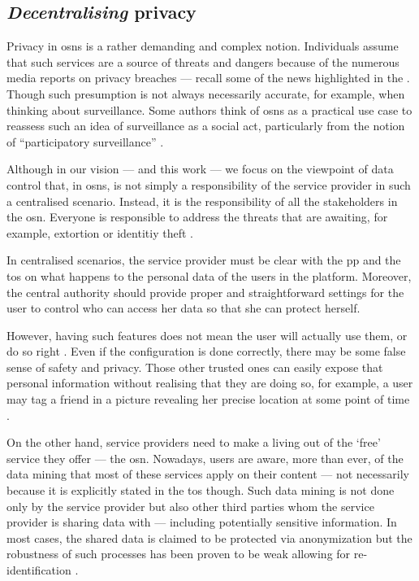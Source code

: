 \subsection{\emph{Decentralising} privacy}
    \label{subsection:thesis:decentralising-privacy}
Privacy in \acp{osn} is a rather demanding and complex notion. Individuals assume 
that such services are a source of threats and dangers because of the numerous media 
reports on privacy breaches --- recall some of the news highlighted in the  
. Though such presumption is not always necessarily 
accurate, for example, when thinking about surveillance. Some authors think of \acp{osn} 
as a practical use case to reassess such an idea of surveillance as a social act, 
particularly from the notion of ``participatory surveillance'' \cite{Albrechtslund08}.

Although in our vision --- and this work --- we focus on the viewpoint of data control 
that, in \acp{osn}, is not simply a responsibility of the service provider in such 
a centralised scenario. Instead, it is the responsibility of all the stakeholders 
in the \ac{osn}. Everyone is responsible to address the threats that are awaiting, 
for example, extortion or identitiy theft \cite{GrossAH05}. 

In centralised scenarios, the service provider must be clear with the \ac{pp} and 
the \ac{tos} on what happens to the personal data of the users in the platform. 
Moreover, the central authority should provide proper and straightforward settings 
for the user to control who can access her data so that she can protect herself. 

However, having such features does not mean the user will actually use them, or   
do so right \cite{KrishnamurthyW08, BrandtzaegLS10}. Even if the configuration is 
done correctly, there may be some false sense of safety and privacy. Those other 
trusted ones can easily expose that personal information without realising that 
they are doing so, for example, a user may tag a friend in a picture revealing her 
precise location at some point of time \cite{ZhelevaG09, SmithSHV12}. 

On the other hand, service providers need to make a living out of the `free' service
they offer --- the \ac{osn}. Nowadays, users are aware, more than ever, of the data 
mining that most of these services apply on their content --- not necessarily because 
it is explicitly stated in the \ac{tos} though. Such data mining is not done only 
by the service provider but also other third parties whom the service provider is 
sharing data with --- including potentially sensitive information. In most cases, 
the shared data is claimed to be protected via anonymization but the robustness 
of such processes has been proven to be weak allowing for re-identification \cite{NarayananS09}.

